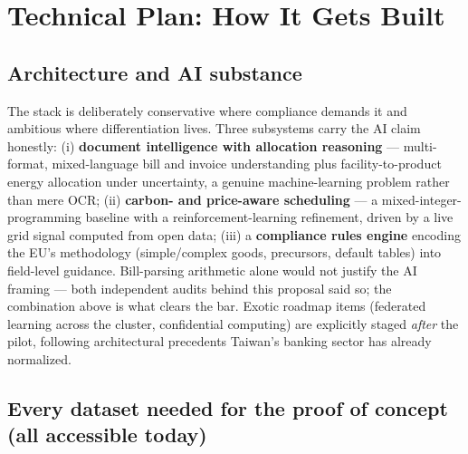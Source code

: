 \section{Technical Plan: How It Gets Built}\label{sec:tech}

\subsection{Architecture and AI substance}

The stack is deliberately conservative where compliance demands it and
ambitious where differentiation lives. Three subsystems carry the AI claim
honestly: (i) \textbf{document intelligence with allocation reasoning} ---
multi-format, mixed-language bill and invoice understanding plus
facility-to-product energy allocation under uncertainty, a genuine
machine-learning problem rather than mere OCR; (ii) \textbf{carbon- and
price-aware scheduling} --- a mixed-integer-programming baseline with a
reinforcement-learning refinement, driven by a live grid signal computed from
open data; (iii) a \textbf{compliance rules engine} encoding the EU's
methodology (simple/complex goods, precursors, default tables) into
field-level guidance. Bill-parsing arithmetic alone would not justify the AI
framing --- both independent audits behind this proposal said so; the
combination above is what clears the bar. Exotic roadmap items (federated
learning across the cluster, confidential computing) are explicitly staged
\emph{after} the pilot, following architectural precedents Taiwan's banking
sector has already normalized.

\subsection{Every dataset needed for the proof of concept (all accessible today)}

